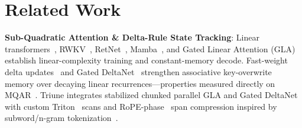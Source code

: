 \documentclass[10pt,twocolumn,letterpaper]{article}
\begin{document}
\begin{table}[t]
\centering
\small
\caption{\textbf{Activation-Checkpointed \texttt{LayerStreamingEngine} vs.\ GPU-Resident Training on 8 GB RTX 5070} ($B=2, T=512, V=4096$, BF16; \texttt{layer\_streaming\_results.json}). All streamed runs stay cleanly inside $7.93\text{ GiB}$ physical VRAM.}
\label{tab:layer_streaming}
\end{table}

\section{Related Work}

\textbf{Sub-Quadratic Attention \& Delta-Rule State Tracking}: Linear transformers~\cite{katharopoulos2020transformers}, RWKV~\cite{peng2023rwkv}, RetNet~\cite{sun2023retentive}, Mamba~\cite{gu2023mamba}, and Gated Linear Attention (GLA)~\cite{yang2023gated} establish linear-complexity training and constant-memory decode. Fast-weight delta updates~\cite{schlag2021linear} and Gated DeltaNet~\cite{yang2024gateddeltanet} strengthen associative key-overwrite memory over decaying linear recurrences—properties measured directly on MQAR~\cite{arora2024zoology}. Triune integrates stabilized chunked parallel GLA and Gated DeltaNet with custom Triton~\cite{tillet2019triton} scans and RoPE-phase~\cite{su2024roformer} span compression inspired by subword/n-gram tokenization~\cite{sennrich2016bpe}.
\end{document}

